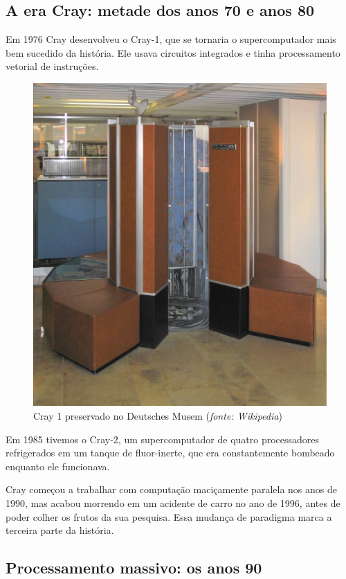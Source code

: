 \documentclass[a4paper]{article}
\begin{document}
\subsection{A era Cray: metade dos anos 70 e anos 80}

Em 1976 Cray desenvolveu o Cray-1, que se tornaria o supercomputador mais bem sucedido da história. Ele usava circuitos integrados e tinha processamento vetorial de instruções.

\begin{figure}[h]
\centering
\includegraphics[scale=0.1]{cray1}
\caption{Cray 1 preservado no Deutsches Musem (\textit{fonte: Wikipedia})}
\end{figure}
Em 1985 tivemos o Cray-2, um supercomputador de quatro processadores refrigerados  em um tanque de fluor-inerte, que era constantemente bombeado enquanto ele funcionava.

Cray começou a trabalhar com computação maciçamente paralela nos anos de 1990, mas acabou morrendo em um acidente de carro no ano de 1996, antes de poder colher os frutos  da sua pesquisa. Essa mudança de paradigma marca a terceira parte da história.

\subsection{Processamento massivo: os anos 90}
\end{document}
